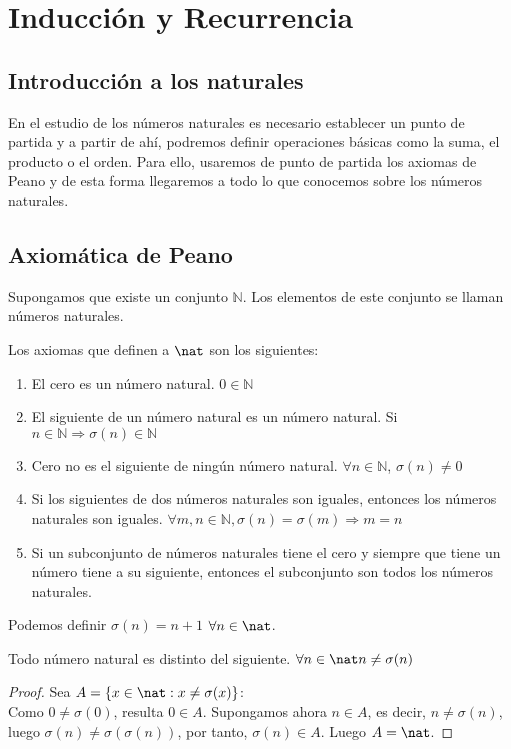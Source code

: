 \section{Inducción y Recurrencia}
\subsection{Introducción a los naturales}
En el estudio de los números naturales es necesario establecer un punto de partida y a partir de ahí, podremos definir operaciones básicas como la suma, el producto o el orden. Para ello, usaremos de punto de partida los axiomas de Peano y de esta forma llegaremos a todo lo que conocemos sobre los números naturales.
\subsection{Axiomática de Peano}
Supongamos que existe un conjunto $\mathbb{N}$. Los elementos de este conjunto se llaman números naturales.
\begin{ndef}
    Los axiomas que definen a $\nat$ son los siguientes:
    \begin{enumerate}[label=\emph{A\arabic*}]
        \item\label{a0} El cero es un número natural. $0 \in \mathbb{N}$
        \item\label{a1} El siguiente de un número natural es un número natural. Si $n \in \mathbb{N} \Rightarrow \sigma(n) \in \mathbb{N}$
        \item\label{a2} Cero no es el siguiente de ningún número natural. $\forall n \in \mathbb{N}$, $\sigma(n) \neq 0$
        \item\label{a3} Si los siguientes de dos números naturales son iguales, entonces los números naturales son iguales. $\forall m,n \in \mathbb{N}, \sigma(n) = \sigma(m) \Rightarrow m = n$
        \item\label{a4} Si un subconjunto de números naturales tiene el cero y siempre que tiene un número tiene a su siguiente, entonces el subconjunto son todos los números naturales.
    \end{enumerate}
\end{ndef}

\begin{nota}
    Podemos definir $\sigma(n) = n + 1$ $\forall n \in \nat$.
\end{nota}

\begin{nth}
    Todo número natural es distinto del siguiente. $\forall n \in \nat n \neq \sigma(n)$
\end{nth}
\begin{proof}
    Sea $A = \{x \in \nat : x \neq \sigma(x)\}$: \\
    Como $0 \neq \sigma(0)$, resulta $0 \in A$.
    Supongamos ahora $n \in A$, es decir, $n \neq \sigma(n)$, luego $\sigma(n) \neq \sigma(\sigma(n))$, por tanto, $\sigma(n) \in A$.
    Luego $A = \nat$.
\end{proof}

